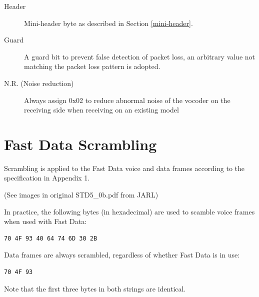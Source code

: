\documentclass[10pt]{report}
\begin{document}
\small{}
\begin{description}
\item[Header] Mini-header byte as described in Section \ref{mini-header}.
\item[Guard] A guard bit to prevent false detection of packet loss,
  an arbitrary value not matching the packet loss pattern is
  adopted.
\item[N.R. (Noise reduction)] Always assign 0x02 to reduce abnormal
  noise of the vocoder on the receiving side when receiving on an
  existing model
\end{description}
\normalsize{}

\section{Fast Data Scrambling}

Scrambling is applied to the Fast Data voice and data frames according
to the specification in Appendix 1.

(See images in original STD5\_0b.pdf from JARL)

In practice, the following bytes (in hexadecimal) are used to scamble
voice frames when used with Fast Data:
\begin{verbatim}
70 4F 93 40 64 74 6D 30 2B
\end{verbatim}
Data frames are always scrambled, regardless of whether Fast Data is in use:
\begin{verbatim}
70 4F 93
\end{verbatim}
Note that the first three bytes in both strings are identical.
\end{document}
